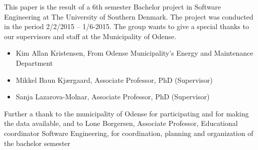 This paper is the result of a 6th semester Bachelor project in Software Engineering at The University of Southern Denmark. The project was conducted in the period 2/2/2015 – 1/6-2015.
\newline
\newline
The group wants to give a special thanks to our supervisors and staff at the Municipality of Odense.
\begin{itemize}
  \item Kim Allan Kristensen, From Odense Municipality’s Energy and Maintenance Department
  \item Mikkel Baun Kjærgaard,     Associate Professor, PhD     (Supervisor)
  \item  Sanja Lazarova-Molnar,     Associate Professor, PhD      (Supervisor)
\end{itemize}
Further a thank to the municipality of Odense for participating and for making the data available, and to Lone Borgersen, Associate Professor, Educational coordinator Software Engineering, for coordination, planning and organization of the bachelor semester
